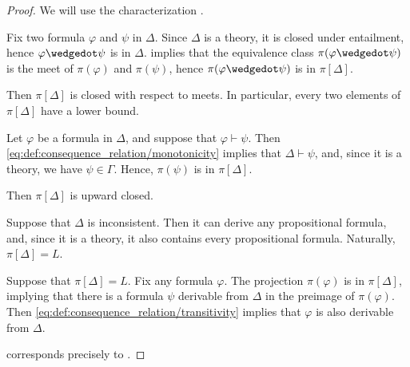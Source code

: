 \begin{proof}
   We will use the characterization .

   Fix two formula \( \varphi \) and \( \psi \) in \( \Delta \). Since \( \Delta \) is a theory, it is closed under entailment, hence \( \varphi \synwedge \psi \) is in \( \Delta \).  implies that the equivalence class \( \pi(\varphi \synwedge \psi) \) is the meet of \( \pi(\varphi) \) and \( \pi(\psi) \), hence \( \pi(\varphi \synwedge \psi) \) is in \( \pi[\Delta] \).

  Then \( \pi[\Delta] \) is closed with respect to meets. In particular, every two elements of \( \pi[\Delta] \) have a lower bound.

   Let \( \varphi \) be a formula in \( \Delta \), and suppose that \( \varphi \vdash \psi \). Then \eqref{eq:def:consequence_relation/monotonicity} implies that \( \Delta \vdash \psi \), and, since it is a theory, we have \( \psi \in \Gamma \). Hence, \( \pi(\psi) \) is in \( \pi[\Delta] \).

  Then \( \pi[\Delta] \) is upward closed.


  \SufficiencySubProof* Suppose that \( \Delta \) is inconsistent. Then it can derive any propositional formula, and, since it is a theory, it also contains every propositional formula. Naturally, \( \pi[\Delta] = L \).

  \NecessitySubProof* Suppose that \( \pi[\Delta] = L \). Fix any formula \( \varphi \). The projection \( \pi(\varphi) \) is in \( \pi[\Delta] \), implying that there is a formula \( \psi \) derivable from \( \Delta \) in the preimage of \( \pi(\varphi) \). Then \eqref{eq:def:consequence_relation/transitivity} implies that \( \varphi \) is also derivable from \( \Delta \).

    corresponds precisely to .
\end{proof}


